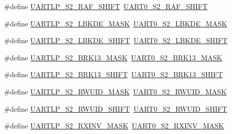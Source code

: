 \begin{DoxyCompactItemize}
\item 
\#define \hyperlink{group___backward___compatibility___symbols_ga135975b0721bd170915cd4337759dfd7}{U\+A\+R\+T\+L\+P\+\_\+\+S2\+\_\+\+R\+A\+F\+\_\+\+S\+H\+I\+FT}~\hyperlink{group___u_a_r_t0___register___masks_ga8e9f146d124df7852ee019088189a84a}{U\+A\+R\+T0\+\_\+\+S2\+\_\+\+R\+A\+F\+\_\+\+S\+H\+I\+FT}
\item 
\#define \hyperlink{group___backward___compatibility___symbols_gaa783dcdafc362c97d89deca6d87ad1e0}{U\+A\+R\+T\+L\+P\+\_\+\+S2\+\_\+\+L\+B\+K\+D\+E\+\_\+\+M\+A\+SK}~\hyperlink{group___u_a_r_t0___register___masks_ga3347bd085733dc5c1d7ed86259528d60}{U\+A\+R\+T0\+\_\+\+S2\+\_\+\+L\+B\+K\+D\+E\+\_\+\+M\+A\+SK}
\item 
\#define \hyperlink{group___backward___compatibility___symbols_gace59d2986627e12405c737f49513fa0c}{U\+A\+R\+T\+L\+P\+\_\+\+S2\+\_\+\+L\+B\+K\+D\+E\+\_\+\+S\+H\+I\+FT}~\hyperlink{group___u_a_r_t0___register___masks_ga79be5f31bb69a54c78a60ae8859caa90}{U\+A\+R\+T0\+\_\+\+S2\+\_\+\+L\+B\+K\+D\+E\+\_\+\+S\+H\+I\+FT}
\item 
\#define \hyperlink{group___backward___compatibility___symbols_ga4ae8233f1781ea7dc494fc5eff1262df}{U\+A\+R\+T\+L\+P\+\_\+\+S2\+\_\+\+B\+R\+K13\+\_\+\+M\+A\+SK}~\hyperlink{group___u_a_r_t0___register___masks_gaeda16004cc22274e11f447311ec15362}{U\+A\+R\+T0\+\_\+\+S2\+\_\+\+B\+R\+K13\+\_\+\+M\+A\+SK}
\item 
\#define \hyperlink{group___backward___compatibility___symbols_ga43368a6f820ea82d1ee803cf7e94c5b1}{U\+A\+R\+T\+L\+P\+\_\+\+S2\+\_\+\+B\+R\+K13\+\_\+\+S\+H\+I\+FT}~\hyperlink{group___u_a_r_t0___register___masks_ga655fdc462508918f7874cb9078e0336b}{U\+A\+R\+T0\+\_\+\+S2\+\_\+\+B\+R\+K13\+\_\+\+S\+H\+I\+FT}
\item 
\#define \hyperlink{group___backward___compatibility___symbols_ga467467c8bbe352103ff116334710d766}{U\+A\+R\+T\+L\+P\+\_\+\+S2\+\_\+\+R\+W\+U\+I\+D\+\_\+\+M\+A\+SK}~\hyperlink{group___u_a_r_t0___register___masks_ga56d14f088c8bf415092b13fc8a7ff8eb}{U\+A\+R\+T0\+\_\+\+S2\+\_\+\+R\+W\+U\+I\+D\+\_\+\+M\+A\+SK}
\item 
\#define \hyperlink{group___backward___compatibility___symbols_ga21655fc24718467c5c7a3a17491ab20c}{U\+A\+R\+T\+L\+P\+\_\+\+S2\+\_\+\+R\+W\+U\+I\+D\+\_\+\+S\+H\+I\+FT}~\hyperlink{group___u_a_r_t0___register___masks_ga087e7d36d10ab05400ef6a3acbe6f83a}{U\+A\+R\+T0\+\_\+\+S2\+\_\+\+R\+W\+U\+I\+D\+\_\+\+S\+H\+I\+FT}
\item 
\#define \hyperlink{group___backward___compatibility___symbols_ga5851ca00d46976a2bb09420d5ea14ce0}{U\+A\+R\+T\+L\+P\+\_\+\+S2\+\_\+\+R\+X\+I\+N\+V\+\_\+\+M\+A\+SK}~\hyperlink{group___u_a_r_t0___register___masks_ga81c81000cf5906711578a36178776ae9}{U\+A\+R\+T0\+\_\+\+S2\+\_\+\+R\+X\+I\+N\+V\+\_\+\+M\+A\+SK}

\end{DoxyCompactItemize}
